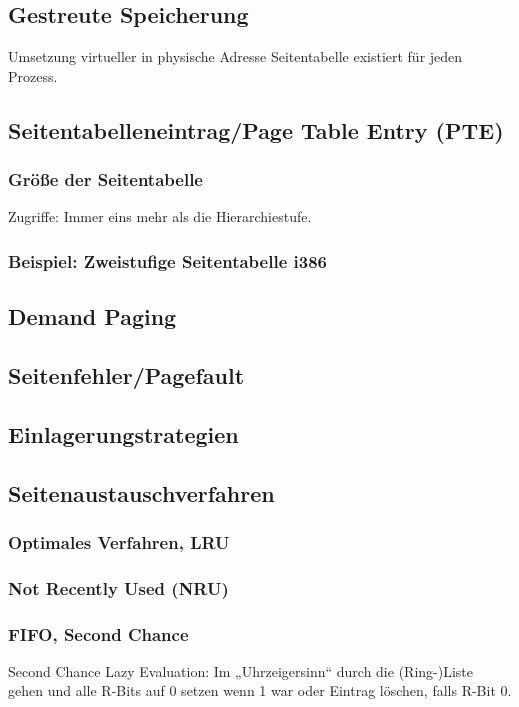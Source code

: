 \subsection{Gestreute Speicherung}
Umsetzung virtueller in physische Adresse
Seitentabelle existiert für jeden Prozess.
\subsection{Seitentabelleneintrag/Page Table Entry (PTE)}
\subsubsection{Größe der Seitentabelle}
Zugriffe: Immer eins mehr als die Hierarchiestufe.
\subsubsection{Beispiel: Zweistufige Seitentabelle i386}
\subsection{Demand Paging}
\subsection{Seitenfehler/Pagefault}
\subsection{Einlagerungstrategien}
\subsection{Seitenaustauschverfahren}
\subsubsection{Optimales Verfahren, LRU}
\subsubsection{Not Recently Used (NRU)}
\subsubsection{FIFO, Second Chance}
Second Chance Lazy Evaluation: Im „Uhrzeigersinn“ durch die (Ring-)Liste gehen und alle R-Bits auf 0 setzen wenn 1 war oder Eintrag löschen, falls R-Bit 0.
